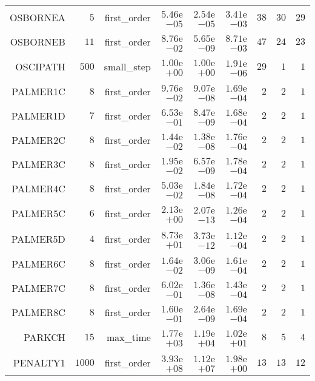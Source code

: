 \begin{longtable}{rrrrrrrrr}
OSBORNEA & \(     5\) & first\_order & \( 5.46\)e\(-05\) & \( 2.54\)e\(-05\) & \( 3.41\)e\(-03\) & \(    38\) & \(    30\) & \(    29\) \\
OSBORNEB & \(    11\) & first\_order & \( 8.76\)e\(-02\) & \( 5.65\)e\(-09\) & \( 8.71\)e\(-03\) & \(    47\) & \(    24\) & \(    23\) \\
OSCIPATH & \(   500\) & small\_step & \( 1.00\)e\(+00\) & \( 1.00\)e\(+00\) & \( 1.91\)e\(-06\) & \(    29\) & \(     1\) & \(     1\) \\
PALMER1C & \(     8\) & first\_order & \( 9.76\)e\(-02\) & \( 9.07\)e\(-08\) & \( 1.69\)e\(-04\) & \(     2\) & \(     2\) & \(     1\) \\
PALMER1D & \(     7\) & first\_order & \( 6.53\)e\(-01\) & \( 8.47\)e\(-09\) & \( 1.68\)e\(-04\) & \(     2\) & \(     2\) & \(     1\) \\
PALMER2C & \(     8\) & first\_order & \( 1.44\)e\(-02\) & \( 1.38\)e\(-08\) & \( 1.76\)e\(-04\) & \(     2\) & \(     2\) & \(     1\) \\
PALMER3C & \(     8\) & first\_order & \( 1.95\)e\(-02\) & \( 6.57\)e\(-09\) & \( 1.78\)e\(-04\) & \(     2\) & \(     2\) & \(     1\) \\
PALMER4C & \(     8\) & first\_order & \( 5.03\)e\(-02\) & \( 1.84\)e\(-08\) & \( 1.72\)e\(-04\) & \(     2\) & \(     2\) & \(     1\) \\
PALMER5C & \(     6\) & first\_order & \( 2.13\)e\(+00\) & \( 2.07\)e\(-13\) & \( 1.26\)e\(-04\) & \(     2\) & \(     2\) & \(     1\) \\
PALMER5D & \(     4\) & first\_order & \( 8.73\)e\(+01\) & \( 3.73\)e\(-12\) & \( 1.12\)e\(-04\) & \(     2\) & \(     2\) & \(     1\) \\
PALMER6C & \(     8\) & first\_order & \( 1.64\)e\(-02\) & \( 3.06\)e\(-09\) & \( 1.61\)e\(-04\) & \(     2\) & \(     2\) & \(     1\) \\
PALMER7C & \(     8\) & first\_order & \( 6.02\)e\(-01\) & \( 1.36\)e\(-08\) & \( 1.43\)e\(-04\) & \(     2\) & \(     2\) & \(     1\) \\
PALMER8C & \(     8\) & first\_order & \( 1.60\)e\(-01\) & \( 2.64\)e\(-09\) & \( 1.69\)e\(-04\) & \(     2\) & \(     2\) & \(     1\) \\
PARKCH & \(    15\) & max\_time & \( 1.77\)e\(+03\) & \( 1.19\)e\(+04\) & \( 1.02\)e\(+01\) & \(     8\) & \(     5\) & \(     4\) \\
PENALTY1 & \(  1000\) & first\_order & \( 3.93\)e\(+08\) & \( 1.12\)e\(+07\) & \( 1.98\)e\(+00\) & \(    13\) & \(    13\) & \(    12\) \\

\end{longtable}

